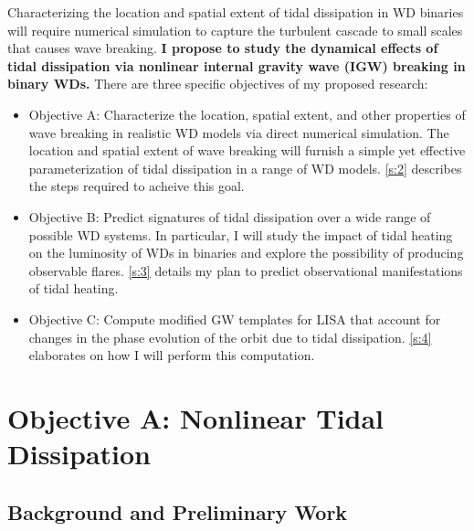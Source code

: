 \documentclass[12pt,
        usenames, %
        dvipsnames %
    ]{article}
\begin{document}
Characterizing the location and spatial extent of tidal dissipation in WD
binaries will require numerical simulation to capture the turbulent cascade to
small scales that causes wave breaking. \textbf{I propose to study the dynamical
effects of tidal dissipation via nonlinear internal gravity wave (IGW) breaking
in binary WDs.} There are three specific objectives of my proposed research:
\begin{itemize}
    \item Objective A\@: Characterize the location, spatial extent, and other
        properties of wave breaking in realistic WD models via direct numerical
        simulation. The location and spatial extent of wave breaking will
        furnish a simple yet effective parameterization of tidal dissipation in
        a range of WD models. \autoref{s:2} describes the steps required to
        acheive this goal.

    \item Objective B\@: Predict signatures of tidal dissipation over a wide
        range of possible WD systems. In particular, I will study the impact of
        tidal heating on the luminosity of WDs in binaries and explore the
        possibility of producing observable flares. \autoref{s:3} details my
        plan to predict observational manifestations of tidal heating.

    \item Objective C\@: Compute modified GW templates for LISA that account for
        changes in the phase evolution of the orbit due to tidal dissipation.
        \autoref{s:4} elaborates on how I will perform this computation.
\end{itemize}

\section{Objective A\@: Nonlinear Tidal Dissipation}\label{s:2}

\subsection{Background and Preliminary Work}
\end{document}
